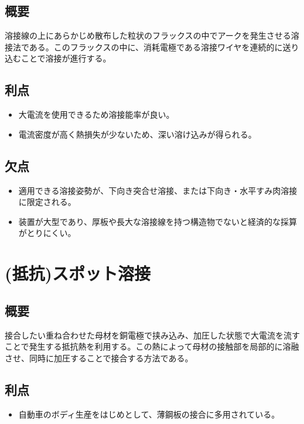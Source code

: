 \documentclass[a4j]{jsarticle}
\begin{document}
\subsection*{概要}
溶接線の上にあらかじめ散布した粒状のフラックスの中でアークを発生させる溶接法である。このフラックスの中に、消耗電極である溶接ワイヤを連続的に送り込むことで溶接が進行する。

\subsection*{利点}
\begin{itemize}
    \item 大電流を使用できるため溶接能率が良い。
    \item 電流密度が高く熱損失が少ないため、深い溶け込みが得られる。
\end{itemize}

\subsection*{欠点}
\begin{itemize}
    \item 適用できる溶接姿勢が、下向き突合せ溶接、または下向き・水平すみ肉溶接に限定される。
    \item 装置が大型であり、厚板や長大な溶接線を持つ構造物でないと経済的な採算がとりにくい。
\end{itemize}

\section*{(抵抗)スポット溶接}

\subsection*{概要}
接合したい重ね合わせた母材を銅電極で挟み込み、加圧した状態で大電流を流すことで発生する抵抗熱を利用する。この熱によって母材の接触部を局部的に溶融させ、同時に加圧することで接合する方法である。

\subsection*{利点}
\begin{itemize}
    \item 自動車のボディ生産をはじめとして、薄鋼板の接合に多用されている。
\end{itemize}
\end{document}
